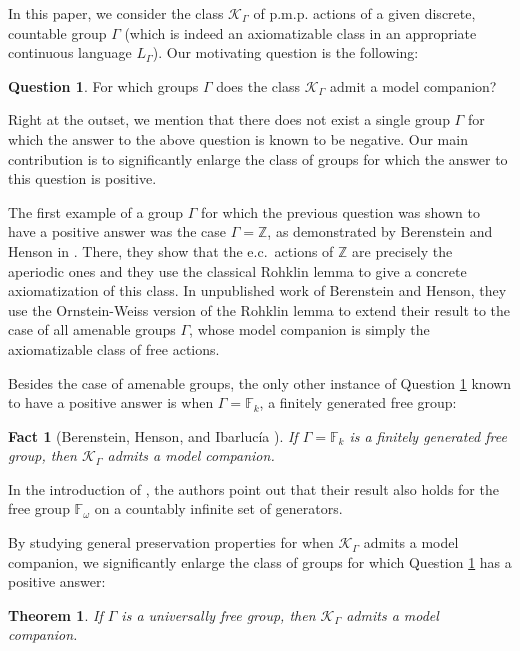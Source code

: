 \documentclass[12pt]{amsart}
\newtheorem*{thm*}{Theorem}
\newtheorem{fact}[thm]{Fact}
\theoremstyle{definition}
\newtheorem{question}[thm]{Question}
\def\bb{\mathbb}
\def\bb{\mathbb}
\def\cal{\mathcal}
\newcommand{\pmp}{p{$.$}m{$.$}p{$.$}}
\begin{document}
In this paper, we consider the class $\cal K_\Gamma$ of {\pmp} actions of a given discrete, countable group $\Gamma$ (which is indeed an axiomatizable class in an appropriate continuous language $L_\Gamma$).  Our motivating question is the following:

\begin{question}\label{mainquestion}
For which groups $\Gamma$ does the class $\cal K_\Gamma$ admit a model companion?
\end{question}

Right at the outset, we mention that there does not exist a single group $\Gamma$ for which the answer to the above question is known to be negative.  Our main contribution is to significantly enlarge the class of groups for which the answer to this question is positive.

The first example of a group $\Gamma$ for which the previous question was shown to have a positive answer was the case $\Gamma=\bb Z$, as demonstrated by Berenstein and Henson in \cite{BH}.  There, they show that the e.c.\ actions of $\bb Z$ are precisely the aperiodic ones and they use the classical Rohklin lemma to give a concrete axiomatization of this class.  In unpublished work of Berenstein and Henson, they use the Ornstein-Weiss version of the Rohklin lemma to extend their result to the case of all amenable groups $\Gamma$, whose model companion is simply the axiomatizable class of free actions.

Besides the case of amenable groups, the only other instance of Question \ref{mainquestion} known to have a positive answer is when $\Gamma=\bb F_k$, a finitely generated free group:

\begin{fact}[Berenstein, Henson, and Ibarluc\'ia \cite{BIH}]\label{BHItheorem}
If $\Gamma=\bb F_k$ is a finitely generated free group, then $\cal K_\Gamma$ admits a model companion.
\end{fact}

In the introduction of \cite{BIH}, the authors point out that their result also holds for the free group $\mathbb{F}_\omega$ on a countably infinite set of generators.

By studying general preservation properties for when $\cal K_\Gamma$ admits a model companion, we significantly enlarge the class of groups for which Question \ref{mainquestion} has a positive answer:

\begin{thm*}
If $\Gamma$ is a universally free group, then $\cal K_\Gamma$ admits a model companion.
\end{thm*}
\end{document}
